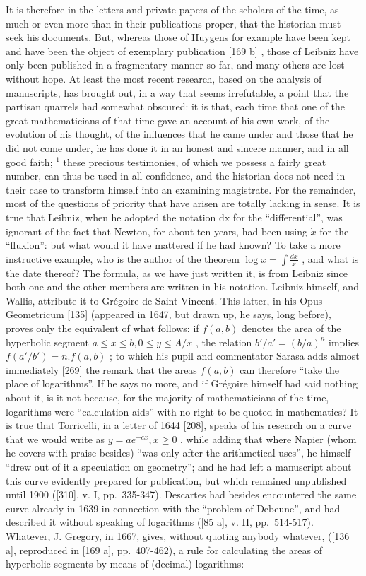 It is therefore in the letters and private papers of the scholars of the time, as much or even more than in their publications proper, that the historian must seek his documents. But, whereas those of Huygens for example have been kept and have been the object of exemplary publication {[}169 b{]} , those of Leibniz have only been published in a fragmentary manner so far, and many others are lost without hope. At least the most recent research, based on the analysis of manuscripts, has brought out, in a way that seems irrefutable, a point that the partisan quarrels had somewhat obscured: it is that, each time that one of the great mathematicians of that time gave an account of his own work, of the evolution of his thought, of the influences that he came under and those that he did not come under, he has done it in an honest and sincere manner, and in all good faith; \(^{1}\) these precious testimonies, of which we possess a fairly great number, can thus be used in all confidence, and the historian does not need in their case to transform himself into an examining magistrate. For the remainder, most of the questions of priority that have arisen are totally lacking in sense. It is true that Leibniz, when he adopted the notation dx for the ``differential'', was ignorant of the fact that Newton, for about ten years, had been using \(\dot{x}\) for the ``fluxion'': but what would it have mattered if he had known? To take a more instructive example, who is the author of the theorem \(\log x = \int \frac{dx}{x}\) , and what is the date thereof? The formula, as we have just written it, is from Leibniz since both one and the other members are written in his notation. Leibniz himself, and Wallis, attribute it to Grégoire de Saint-Vincent. This latter, in his Opus Geometricum {[}135{]} (appeared in 1647, but drawn up, he says, long before), proves only the equivalent of what follows: if \(f(a,b)\) denotes the area of the hyperbolic segment \(a \leq x \leq b, 0 \leq y \leq A/x\) , the relation \(b'/a' = (b/a)^n\) implies \(f(a'/b') = n.f(a,b)\) ; to which his pupil and commentator Sarasa adds almost immediately {[}269{]} the remark that the areas \(f(a,b)\) can therefore ``take the place of logarithms''. If he says no more, and if Grégoire himself had said nothing about it, is it not because, for the majority of mathematicians of the time, logarithms were ``calculation aids'' with no right to be quoted in mathematics? It is true that Torricelli, in a letter of 1644 {[}208{]}, speaks of his research on a curve that we would write as \(y = ae^{-cx}, x \geq 0\) , while adding that where Napier (whom he covers with praise besides) ``was only after the arithmetical uses'', he himself ``drew out of it a speculation on geometry''; and he had left a manuscript about this curve evidently prepared for publication, but which remained unpublished until 1900 ({[}310{]}, v. I, pp.~335-347). Descartes had besides encountered the same curve already in 1639 in connection with the ``problem of Debeune'', and had described it without speaking of logarithms ({[}85 a{]}, v. II, pp.~514-517). Whatever, J. Gregory, in 1667, gives, without quoting anybody whatever, ({[}136 a{]}, reproduced in {[}169 a{]}, pp.~407-462), a rule for calculating the areas of hyperbolic segments by means of (decimal) logarithms: 